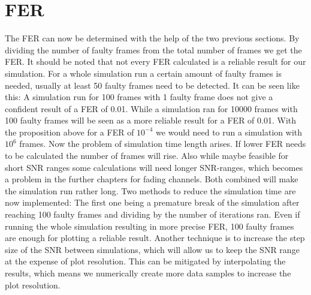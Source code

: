 \section{FER}
\label{sec:FER}
The \gls{FER} can now be determined with the help of the two previous sections. By dividing the number of faulty frames from the total number of frames we get the \gls{FER}. It should be noted that not every \gls{FER} calculated is a reliable result for our simulation. For a whole simulation run a certain amount of faulty frames is needed, usually at least 50 faulty frames need to be detected. It can be seen like this: A simulation run for 100 frames with 1 faulty frame does not give a confident result of a \gls{FER} of 0.01. While a simulation ran for 10000 frames with 100 faulty frames will be seen as a more reliable result for a \gls{FER} of 0.01. 
\newline
With the proposition above for a \gls{FER} of $10^{-4}$ we would need to run a simulation with $10^6$ frames. Now the problem of simulation time length arises. If lower \gls{FER} needs to be calculated the number of frames will rise. Also while maybe feasible for short SNR ranges some calculations will need longer SNR-ranges, which becomes a problem in the further chapters for fading channels. Both combined will make the simulation run rather long.
\newline
Two methods to reduce the simulation time are now implemented: The first one being a premature break of the simulation after reaching 100 faulty frames and dividing by the number of iterations ran. Even if running the whole simulation resulting in more precise \gls{FER}, 100 faulty frames are enough for plotting a reliable result. Another technique is to increase the step size of the SNR between simulations, which will allow us to keep the SNR range at the expense of plot resolution. This can be mitigated by interpolating the results, which means we numerically create more data samples to increase the plot resolution.

\newpage
